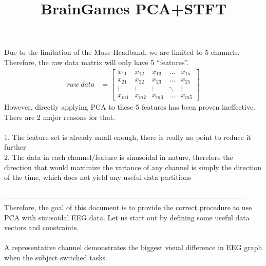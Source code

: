 \documentclass{article}
\title{BrainGames PCA+STFT}
\begin{document}
\maketitle
Due to the limitation of the Muse Headband, we are limited to 5 channels. Therefore, the raw data matrix will only have 5 “features”.
  \begin{align}
    raw\:data &= \begin{bmatrix}
            x_{11} & x_{12} & x_{13} & \dots  & x_{15} \\
   		   x_{21} & x_{22} & x_{23} & \dots  & x_{25} \\
            \vdots & \vdots & \vdots & \ddots & \vdots \\
            x_{m1} & x_{m2} & x_{m3} & \dots  & x_{m5}
         \end{bmatrix}
  \end{align}
However, directly applying PCA to these 5 features has been proven ineffective. There are 2 major reasons for that. \\
\\
1. The feature set is already small enough, there is really no point to reduce it further\\
2. The data in each channel/feature is sinusoidal in nature, therefore the direction that would maximize the variance of any channel is simply the direction of the time, which does not yield any useful data partitions\\
\\
-----------------------------------------------------------------------------------------------------\\
Therefore, the goal of this document is to provide the correct procedure to use PCA with sinusoidal EEG data. Let us start out by defining some useful data vectors and constraints.\\
\\
A representative channel demonstrates the biggest visual difference in EEG graph when the subject switched tasks.\\
\end{document}
